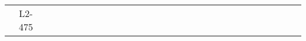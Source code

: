 \begin{table*}[]
\begin{tabular}{cc|cccccccccccccccccccccccccccc}
        &L2-475& \hspace{-1.2em} & \hspace{-0.9em}
\end{tabular}
\end{table*}

